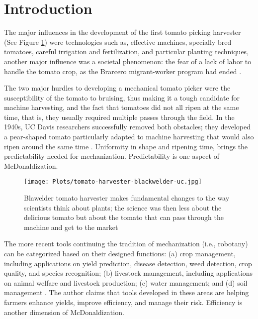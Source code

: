 \section{Introduction} 
The major influences in the development of the first tomato picking harvester (See Figure \ref{fig:tomatoharvester}) were technologies such as, effective machines, specially bred tomatoes, careful irrigation and fertilization, and particular planting techniques, another major influence was a societal phenomenon: the fear of a lack of labor to handle the tomato crop, as the Brarcero migrant-worker program had ended \cite{rasmussen1968advances}. 

The two major hurdles to developing a mechanical tomato picker were the susceptibility of the tomato to bruising, thus making it a tough candidate for machine harvesting, and the fact that tomatoes did not all ripen at the same time, that is, they usually required multiple passes through the field. In the 1940s, UC Davis researchers successfully removed both obstacles; they developed a pear-shaped tomato particularly adapted to machine harvesting that would also ripen around the same time \cite{rasmussen1968advances}. Uniformity in shape and ripening time, brings the predictability needed for mechanization. Predictability is one aspect of McDonaldization. 


\begin{figure}[ht]
	\centering
	\texttt{[image: Plots/tomato-harvester-blackwelder-uc.jpg]}
	\caption{Blawelder tomato harvester makes fundamental changes to the way scientists think about plants; the science was then less about the delicious tomato but about the tomato that can pass through the machine and get to the market \protect{}} 
	\label{fig:tomatoharvester}
\end{figure}

The more recent tools continuing the tradition of mechanization (i.e., robotany) can be categorized based on their designed functions: (a) crop management, including applications on yield prediction, disease detection, weed detection, crop quality, and species recognition; (b) livestock management, including applications on animal welfare and livestock production; (c) water management; and (d) soil management \cite{liakos2018machine}. The author claims that tools developed in these areas are helping farmers enhance yields, improve efficiency, and manage their risk. Efficiency is another dimension of McDonaldization. 

